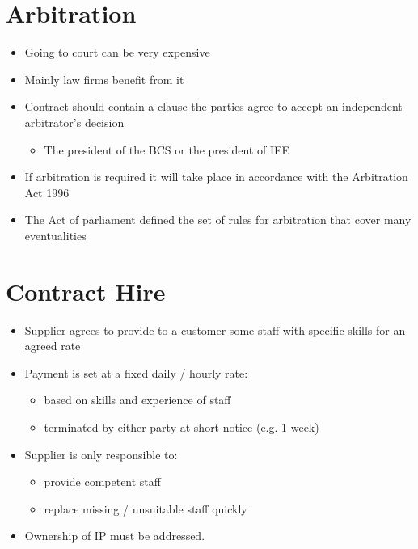 \documentclass{article}
\begin{document}
\section{Arbitration}
\begin{itemize}
\item Going to court can be very expensive
\item Mainly law firms benefit from it
\item Contract should contain a clause the parties agree to accept an independent arbitrator's decision
\begin{itemize}
\item The president of the BCS or the president of IEE
\end{itemize}
\item If arbitration is required it will take place in accordance with the Arbitration Act 1996
\item The Act of parliament defined the set of rules for arbitration that cover many eventualities
\end{itemize}



\section{Contract Hire}
\begin{itemize}
\item Supplier agrees to provide to a customer some staff with specific skills for an agreed rate
\item Payment is set at a fixed daily / hourly rate:
\begin{itemize}
\item based on skills and experience of staff
\item terminated by either party at short notice (e.g. 1 week)
\end{itemize}
\item Supplier is only responsible to:
\begin{itemize}
\item provide competent staff
\item replace missing / unsuitable staff quickly
\end{itemize}
\item Ownership of IP must be addressed.
\end{itemize}
\end{document}
